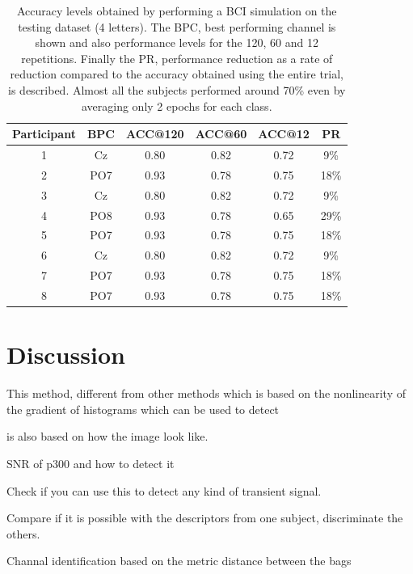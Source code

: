 \documentclass[entropy,article,submit,moreauthors,pdftex,10pt,a4paper]{mdpi}
\begin{document}
\begin{table}[H]
\caption{Accuracy levels obtained by performing a BCI simulation on the testing dataset (4 letters). The BPC, best performing channel is shown and also performance levels for the 120, 60 and 12 repetitions. Finally the PR, performance reduction as a rate of reduction compared to the accuracy obtained using the entire trial, is described.  Almost all the subjects performed around 70\% even by averaging only 2 epochs for each class.}
\centering
\begin{tabular}{cccccc}
\toprule
\textbf{Participant}	& \textbf{BPC}	& \textbf{ACC@120}	& \textbf{ACC@60}	&  \textbf{ACC@12} & \textbf{PR}\\
\midrule
1 & Cz &   0.80 &   0.82 &   0.72 & 9\% \\
2 & PO7 &   0.93 &   0.78 &   0.75 & 18\%\\
3 & Cz &   0.80 &   0.82 &   0.72 & 9\%\\
4 & PO8 &   0.93 &   0.78 &   0.65 & 29\%\\
5 & PO7 &   0.93 &   0.78 &   0.75 & 18\%\\
6 & Cz &   0.80 &   0.82 &   0.72 & 9\%\\
7 & PO7 &   0.93 &   0.78 &   0.75 & 18\%\\
8 & PO7 &   0.93 &   0.78 &   0.75 & 18\%\\
\bottomrule
\end{tabular}
\label{tab:singletrialreduction}
\end{table}

\section{Discussion}

This method, different from other methods which is based on the nonlinearity of the gradient of histograms which can be used to detect 

is also based on how the image look like.

SNR of p300 and how to detect it

Check if you can use this to detect any kind of transient signal.

Compare if it is possible with the descriptors from one subject, discriminate the others.

Channal identification based on the metric distance between the bags
\end{document}

